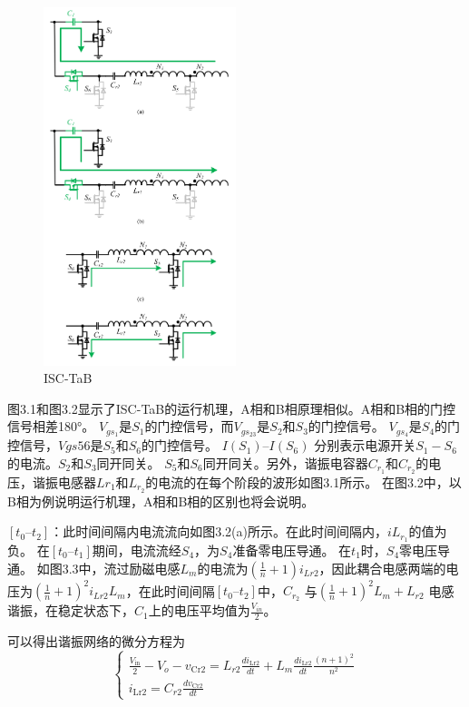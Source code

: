 \documentclass[12pt,a4paper]{report}
\begin{document}
\begin{figure}[h]
    \centering
    \includegraphics[width = 0.5\textwidth]{figures/current actual direction.png}
    \caption{ISC-TaB}
\end{figure}

图3.1和图3.2显示了ISC-TaB的运行机理，A相和B相原理相似。A相和B相的门控信号相差180°。
$V_{gs_1}$是$S_1$的门控信号，而$V_{gs_{23}}$是$S_2$和$S_3$的门控信号。 $V_{gs_4}$是$S_4$的门控信号，$Vgs56$是$S_5$和$S_6$的门控信号。
$I(S_1)–I(S_6)$ 分别表示电源开关$S_1-S_6$的电流。$S_2$和$S_3$同开同关。 $S_5$和$S_6$同开同关。另外，谐振电容器$C_{r_1}$和$C_{r_2}$的电压，谐振电感器$L{r_1}$和$L_{r_2}$的电流的在每个阶段的波形如图3.1所示。
在图3.2中，以B相为例说明运行机理，A相和B相的区别也将会说明。
 
$[t_0–t_2]$：此时间间隔内电流流向如图3.2(a)所示。在此时间间隔内，$iL_{r_1}$的值为负。 在$[t_0–t_1]$期间，电流流经$S_4$，为$S_4$准备零电压导通。
在$t_1$时，$S_4$零电压导通。 如图3.3中，流过励磁电感$L_m$的电流为$\left(\frac{1}{n}+1\right) i_{L r 2}$，因此耦合电感两端的电压为$\left(\frac{1}{n}+1\right)^{2} i_{L r 2} L_{m}$，在此时间间隔$[t_0–t_2]$中，$C_{r_2}$ 与$\left(\frac{1}{n}+1\right)^{2} L_{m}+L_{r 2}$ 电感谐振，在稳定状态下，$C_1$上的电压平均值为$\frac{V_{i n}}{2}$。 


可以得出谐振网络的微分方程为
\begin{equation}
    \left\{\begin{array}{l}
    \frac{V_{\mathrm{in}}}{2}-V_{o}-v_{\mathrm{Cr} 2}=L_{r 2} \frac{d i_{\mathrm{Lr} 2}}{d t}+L_{m} \frac{d i_{\mathrm{Lr} 2}}{d t} \frac{(n+1)^{2}}{n^{2}} \\
    i_{\mathrm{Lr} 2}=C_{r 2} \frac{d v_{\mathrm{Cr} 2}}{d t}
    \end{array}\right.
\end{equation}
\end{document}
